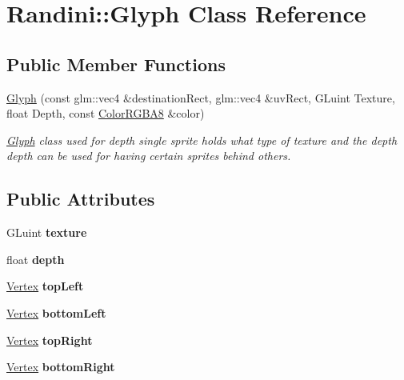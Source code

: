 \hypertarget{classRandini_1_1Glyph}{
\section{Randini::Glyph Class Reference}
\label{classRandini_1_1Glyph}
}
\subsection*{Public Member Functions}
\begin{DoxyCompactItemize}
\item 
\hyperlink{classRandini_1_1Glyph_a14fd7b79d6d01c71bdd82332b1f34371}{Glyph} (const glm::vec4 \&destinationRect, glm::vec4 \&uvRect, GLuint Texture, float Depth, const \hyperlink{structRandini_1_1ColorRGBA8}{ColorRGBA8} \&color)
\begin{DoxyCompactList}\small\item\em \hyperlink{classRandini_1_1Glyph}{Glyph} class used for depth single sprite holds what type of texture and the depth depth can be used for having certain sprites behind others. \item\end{DoxyCompactList}\end{DoxyCompactItemize}
\subsection*{Public Attributes}
\begin{DoxyCompactItemize}
\item 
\hypertarget{classRandini_1_1Glyph_af3667938fd80ddfdcf2d0690d227d6bb}{
GLuint {\bfseries texture}}
\label{classRandini_1_1Glyph_af3667938fd80ddfdcf2d0690d227d6bb}

\item 
\hypertarget{classRandini_1_1Glyph_a8130f05b1e9ac37c6422b981709f1faa}{
float {\bfseries depth}}
\label{classRandini_1_1Glyph_a8130f05b1e9ac37c6422b981709f1faa}

\item 
\hypertarget{classRandini_1_1Glyph_a81f10d38eecced6e3aae7638e33ae3e6}{
\hyperlink{structRandini_1_1Vertex}{Vertex} {\bfseries topLeft}}
\label{classRandini_1_1Glyph_a81f10d38eecced6e3aae7638e33ae3e6}

\item 
\hypertarget{classRandini_1_1Glyph_a77d59c9524bdb6ad7fb2ff98c3010c5c}{
\hyperlink{structRandini_1_1Vertex}{Vertex} {\bfseries bottomLeft}}
\label{classRandini_1_1Glyph_a77d59c9524bdb6ad7fb2ff98c3010c5c}

\item 
\hypertarget{classRandini_1_1Glyph_a0ff0b38ae745ed6096269060b43f949e}{
\hyperlink{structRandini_1_1Vertex}{Vertex} {\bfseries topRight}}
\label{classRandini_1_1Glyph_a0ff0b38ae745ed6096269060b43f949e}

\item 
\hypertarget{classRandini_1_1Glyph_ae0cb1412ee92898d262840eca9f14f6b}{
\hyperlink{structRandini_1_1Vertex}{Vertex} {\bfseries bottomRight}}
\label{classRandini_1_1Glyph_ae0cb1412ee92898d262840eca9f14f6b}

\end{DoxyCompactItemize}


